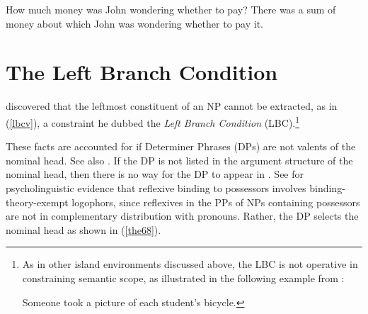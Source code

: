 \documentclass[output=paper,biblatex,babelshorthands,newtxmath,draftmode,colorlinks,citecolor=brown]{langscibook}
\begin{document}
\eal \label{kro}
\ex How much money was John wondering whether to pay?
\ex There was a sum of money about which John was wondering whether
to pay it.
\zl


\section{The Left Branch Condition}

\citet[207]{Ross67} discovered that the leftmost constituent of an NP cannot be extracted, as in
(\ref{lbcv}), a constraint he dubbed the \emph{Left Branch Condition} (LBC).\footnote{As in other
  island environments discussed above, the LBC is not operative in constraining semantic scope, as
  illustrated in the following example from :

\ea
Someone took a picture of each student's bicycle.
\zlast}
 
 
\eal \label{lbcv}
 

\zl


\noindent
These facts are accounted for if Determiner Phrases (DPs) are not valents of the nominal head. See also . If the DP is not listed in the argument
  structure of the nominal head, then there is no way for the DP to appear in \SLASH.  See
  \citet{runner06} for psycholinguistic evidence that reflexive binding to possessors involves
  binding-theory-exempt logophors, since reflexives in the PPs of NPs containing possessors are not
  in complementary distribution with pronouns.  Rather, the DP selects the nominal head as shown in
(\ref{the68}).

\ea \label{the68}
\z
\end{document}
